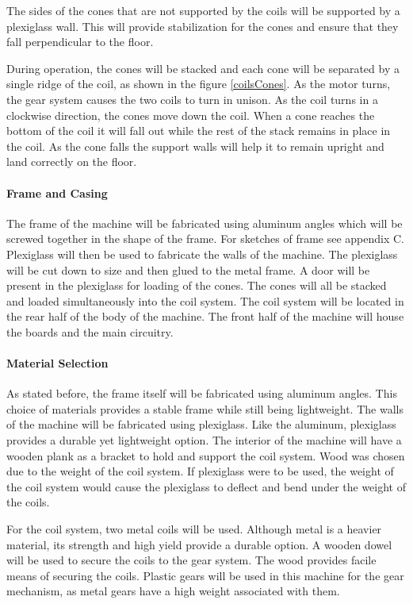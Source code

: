 \documentclass[11pt]{report}
\begin{document}
The sides of the cones that are not supported by the coils will be supported by a plexiglass wall. This will provide stabilization for the cones and ensure that they fall perpendicular to the floor.

During operation, the cones will be stacked and each cone will be separated by a single ridge of the coil, as shown in the figure \ref{coilsCones}. As the motor turns, the gear system causes the two coils to turn in unison. As the coil turns in a clockwise direction, the cones move down the coil. When a cone reaches the bottom of the coil it will fall out while the rest of the stack remains in place in the coil. As the cone falls the support walls will help it to remain upright and land correctly on the floor.


\paragraph{Frame and Casing}
The frame of the machine will be fabricated using aluminum angles which will be screwed together in the shape of the frame. For sketches of frame see appendix C. Plexiglass will then be used to fabricate the walls of the machine. The plexiglass will be cut down to size and then glued to the metal frame. A door will be present in the plexiglass for loading of the cones. The cones will all be stacked and loaded simultaneously into the coil system. The coil system will be located in the rear half of the body of the machine. The front half of the machine will house the boards and the main circuitry. 

\paragraph{Material Selection}

As stated before, the frame itself will be fabricated using aluminum angles. This choice of materials provides a stable frame while still being lightweight. The walls of the machine will be fabricated using plexiglass. Like the aluminum, plexiglass provides a durable yet lightweight option. The interior of the machine will have a wooden plank as a bracket to hold and support the coil system. Wood was chosen due to the weight of the coil system. If plexiglass were to be used, the weight of the coil system would cause the plexiglass to deflect and bend under the weight of the coils.

For the coil system, two metal coils will be used. Although metal is a heavier material, its strength and high yield provide a durable option. A wooden dowel will be used to secure the coils to the gear system. The wood provides facile means of securing the coils. Plastic gears will be used in this machine for the gear mechanism, as metal gears have a high weight associated with them.
\end{document}
